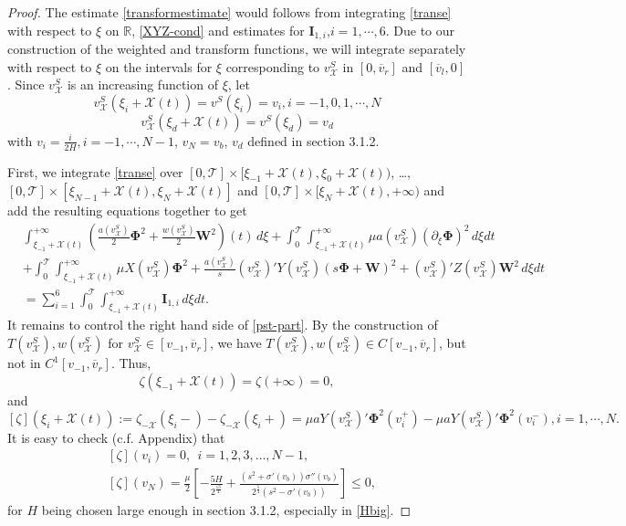 \documentclass[10pt,a4paper]{amsart}
\def\T{\mathcal{T}}
\def\X{\mathcal{X}}
\def\avl{\overline{v}_l}
\def\avr{\overline{v}_r}
\def\ph{\mathbf{\Phi}}
\def\p{\partial}
\def\vsx{v^S_{\mathcal{X}}}
\def\w{\mathbf{W}}
\begin{document}
\begin{proof}
	The estimate \eqref{transformestimate} would follows from integrating \eqref{transe} with respect to $\xi$ on $\mathbb{R}$, \eqref{XYZ-cond} and estimates for $\textbf{I}_{1,i}$,$i=1,\cdots,6$. Due to our construction of the weighted and transform functions, we will integrate separately with respect to $\xi$ on the intervals for $\xi$ corresponding to $\vsx$ in $[0,\avr]$ and $[\avl,0]$. Since $\vsx$ is an increasing function of $\xi$, let
	$$\vsx(\xi_i+\X(t))=v^S(\xi_i)=v_i, i=-1,0,1,\cdots,N$$
	$$\vsx(\xi_d+\X(t))=v^S(\xi_d)=v_d$$
	with $v_i=\frac{i}{2H},i=-1,\cdots, N-1$, $v_N=v_b$, $v_d$ defined in section 3.1.2.  
	
	First, we integrate \eqref{transe} over $[0,\T]\times[\xi_{-1}+\X(t),\xi_0+\X(t))$,  \dots, $[0,\T]\times[\xi_{N-1}+\X(t),\xi_N+\X(t)]$ and 
	$[0,\T]\times[\xi_N+\X(t),+\infty)$ and add the resulting equations together to get
\begin{equation}\label{pst-part}
	\begin{aligned}
		&\int_{\xi_{-1}+\X(t)}^{+\infty}\left(\frac{a(\vsx)}{2}\ph^2+\frac{w(\vsx)}{2}\w^2\right)(t)\,d\xi+\int_{0}^{\T}\int_{\xi_{-1}+\X(t)}^{+\infty}\mu a(\vsx)(\p_{\xi}\ph)^2\,d\xi dt\\
		&+\int_{0}^{\T}\int_{\xi_{-1}+\X(t)}^{+\infty}\mu X(\vsx)\ph^2+\frac{a(\vsx)}{s}(\vsx)'Y(\vsx)(s\ph+\w)^2+(\vsx)'Z(\vsx)\w^2\,d\xi dt\\
		&=\sum_{i=1}^{6}\int_{0}^{\T}\int_{\xi_{-1}+\X(t)}^{+\infty}\textbf{I}_{1,i}\,d\xi dt.
	\end{aligned}
\end{equation}
	It remains to control the right hand side of \eqref{pst-part}. By the construction of $T(\vsx),w(\vsx)$ for $\vsx\in[v_{-1},\avr]$, we have $T(\vsx),w(\vsx) \in C[v_{-1},\avr]$,
	but not in $C^1[v_{-1},\avr]$.  Thus,
	$$\zeta(\xi_{-1}+\X(t))=\zeta(+\infty)=0,$$
	and
	$$[\zeta](\xi_i+\X(t)):=\zeta_{-\X}(\xi_i-)-\zeta_{-\X}(\xi_i+)=\mu aY(\vsx)'\ph^2(v_i^+)-\mu aY(\vsx)'\ph^2(v_i^-),i=1,\cdots, N.$$
	It is easy to check (c.f. Appendix) that
	\begin{equation}\label{interact}
		\begin{aligned}
			&[\zeta](v_i)=0,~~i=1,2,3,\dots,N-1,\\
			&[\zeta](v_N)=\frac{\mu}{2}[-\frac{5H}{2^{\frac{13}{4}}}+\frac{(s^2+\sigma'(v_b))\sigma''(v_b)}{2^{\frac{5}{4}}(s^2-\sigma'(v_b))}]\leq 0,
		\end{aligned}
	\end{equation}
	for $H$ being chosen large enough in section 3.1.2, especially in \eqref{Hbig}. 

\end{proof}
\end{document}
